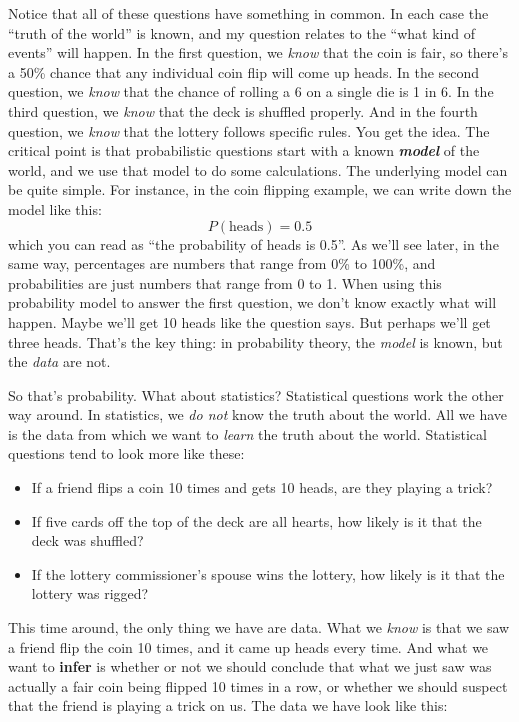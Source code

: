 \documentclass[
]{book}
\providecommand{\tightlist}{%
  \setlength{\itemsep}{0pt}\setlength{\parskip}{0pt}}
\theoremstyle{definition}
\theoremstyle{definition}
\theoremstyle{definition}
\theoremstyle{definition}
\theoremstyle{remark}
\begin{document}
Notice that all of these questions have something in common. In each case the ``truth of the world'' is known, and my question relates to the ``what kind of events'' will happen. In the first question, we \emph{know} that the coin is fair, so there's a 50\% chance that any individual coin flip will come up heads. In the second question, we \emph{know} that the chance of rolling a 6 on a single die is 1 in 6. In the third question, we \emph{know} that the deck is shuffled properly. And in the fourth question, we \emph{know} that the lottery follows specific rules. You get the idea. The critical point is that probabilistic questions start with a known \textbf{\emph{model}} of the world, and we use that model to do some calculations. The underlying model can be quite simple. For instance, in the coin flipping example, we can write down the model like this:
\[
P(\mbox{heads}) = 0.5
\]
which you can read as ``the probability of heads is 0.5''. As we'll see later, in the same way, percentages are numbers that range from 0\% to 100\%, and probabilities are just numbers that range from 0 to 1. When using this probability model to answer the first question, we don't know exactly what will happen. Maybe we'll get 10 heads like the question says. But perhaps we'll get three heads. That's the key thing: in probability theory, the \emph{model} is known, but the \emph{data} are not.

So that's probability. What about statistics? Statistical questions work the other way around. In statistics, we \emph{do not} know the truth about the world. All we have is the data from which we want to \emph{learn} the truth about the world. Statistical questions tend to look more like these:

\begin{itemize}
\tightlist
\item
  If a friend flips a coin 10 times and gets 10 heads, are they playing a trick?
\item
  If five cards off the top of the deck are all hearts, how likely is it that the deck was shuffled?
\item
  If the lottery commissioner's spouse wins the lottery, how likely is it that the lottery was rigged?
\end{itemize}

This time around, the only thing we have are data. What we \emph{know} is that we saw a friend flip the coin 10 times, and it came up heads every time. And what we want to \textbf{infer} is whether or not we should conclude that what we just saw was actually a fair coin being flipped 10 times in a row, or whether we should suspect that the friend is playing a trick on us. The data we have look like this:
\end{document}
